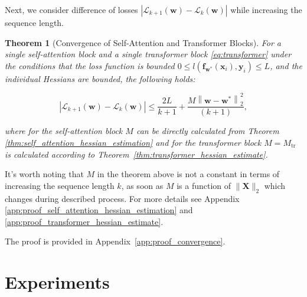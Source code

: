 \documentclass{article}
\newtheorem{theorem}{Theorem} %
\begin{document}

Next, we consider difference of losses $ \left| \mathcal{L}_{k+1}(\mathbf{w}) - \mathcal{L}_k(\mathbf{w}) \right|$ while increasing the sequence length.

\begin{theorem}[Convergence of Self-Attention and Transformer Blocks]\label{thm:convergence}
For a single self-attention block and a single transformer block \ref{eq:transformer} under the conditions that the loss function is bounded \(0 \leqslant l(\mathbf{f}_{\mathbf{w}^*}(\mathbf{x}_i), \mathbf{y}_i) \leqslant L\), and the individual Hessians are bounded, the following holds:

\[
\left| \mathcal{L}_{k+1}(\mathbf{w}) - \mathcal{L}_k(\mathbf{w}) \right| \leqslant \dfrac{2L}{k+1} + \dfrac{M \left\| \mathbf{w} - \mathbf{w}^* \right\|_2^2}{(k+1)},
\]

where for the self-attention block $M$ can be directly calculated from Theorem \ref{thm:self_attention_hessian_estimation}
and for the transformer block \(M = M_{\text{tr}}\) is calculated according to Theorem~\ref{thm:transformer_hessian_estimate}.
\end{theorem}

It's worth noting that $M$ in the theorem above is not a constant in terms of increasing the sequence length $k$, as soon as $M$ is a function of $\|\mathbf{X}\|_2$ which changes during described process. For more details see Appendix \ref{app:proof_self_attention_hessian_estimation} and \ref{app:proof_transformer_hessian_estimate}.

The proof is provided in Appendix~\ref{app:proof_convergence}.

\section{Experiments}\label{sec:exp}
\end{document}
